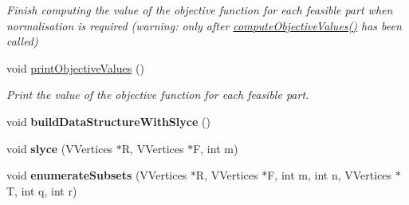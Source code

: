 \begin{DoxyCompactItemize}
\begin{DoxyCompactList}\small\item\em Finish computing the value of the objective function for each feasible part when normalisation is required (warning\-: only after \hyperlink{classGraph_a237d09042d6411b64075e7b62bb5afaf}{compute\-Objective\-Values()} has been called) \end{DoxyCompactList}\item 
\hypertarget{classGraph_a353894a995807b625cf5713e79696a9d}{void \hyperlink{classGraph_a353894a995807b625cf5713e79696a9d}{print\-Objective\-Values} ()}\label{classGraph_a353894a995807b625cf5713e79696a9d}

\begin{DoxyCompactList}\small\item\em Print the value of the objective function for each feasible part. \end{DoxyCompactList}\item 
\hypertarget{classGraph_a78cfa04d5b7ea02297ec5014cd4e3356}{void {\bfseries build\-Data\-Structure\-With\-Slyce} ()}\label{classGraph_a78cfa04d5b7ea02297ec5014cd4e3356}

\item 
\hypertarget{classGraph_aa8e39f9a9010d0a010098b5090913550}{void {\bfseries slyce} (V\-Vertices $\ast$R, V\-Vertices $\ast$F, int m)}\label{classGraph_aa8e39f9a9010d0a010098b5090913550}

\item 
\hypertarget{classGraph_a518d7674ed8a64999503eb42834d4dcc}{void {\bfseries enumerate\-Subsets} (V\-Vertices $\ast$R, V\-Vertices $\ast$F, int m, int n, V\-Vertices $\ast$T, int q, int r)}\label{classGraph_a518d7674ed8a64999503eb42834d4dcc}


\end{DoxyCompactItemize}
